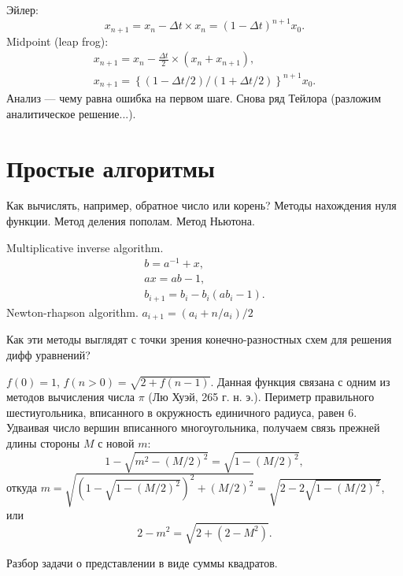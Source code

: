 \documentclass{book}
\begin{document}
Эйлер:
\begin{equation}
    x_{n+1} = x_{n} - \Delta t \times x_n = (1 - \Delta t)^{n + 1} x_0.
\end{equation}
Midpoint (leap frog):
\begin{eqnarray}
    x_{n+1} = x_{n} - \frac{\Delta t}{2} \times (x_n + x_{n+1}), \\
    x_{n+1} = \left\{ (1 - \Delta t / 2) / (1 + \Delta t / 2) \right\}^{n+1} x_0.
\end{eqnarray}
Анализ --- чему равна ошибка на первом шаге. Снова ряд Тейлора (разложим аналитическое решение...).

\section{Простые алгоритмы}

Как вычислять, например, обратное число или корень?
Методы нахождения нуля функции. Метод деления пополам. Метод Ньютона.

Multiplicative inverse algorithm.
\begin{eqnarray}
    b = a^{-1} + x, \\
    ax = ab - 1, \\
    b_{i + 1} = b_i - b_i (ab_i - 1).
\end{eqnarray}
Newton-rhapson algorithm.
$a_{i+1} = (a_i + n / a_i) / 2$

Как эти методы выглядят с точки зрения конечно-разностных схем для решения дифф уравнений?

  $f(0) = 1$, $f(n>0) = \sqrt{2 + f(n - 1)}$. Данная функция связана с
   одним из методов вычисления числа $\pi$ (Лю Хуэй, 265 г. н. э.). Периметр
   правильного шестиугольника, вписанного в окружность единичного радиуса, равен
   $6$. Удваивая число вершин вписанного многоугольника, получаем связь прежней
   длины стороны $M$ с новой $m$:
   \begin{equation}
     1 - \sqrt{m^2 - (M / 2)^2} = \sqrt{1 - (M / 2)^2},
   \end{equation}
   откуда $m = \sqrt{\left(1 - \sqrt{1 - (M / 2)^2}\right)^2 + (M / 2)^2} =
   \sqrt{2 - 2\sqrt{1 - (M / 2)^2}}$, или
   \begin{equation}
     2 - m^2 = \sqrt{2 + (2 - M^2)}.
   \end{equation}


Разбор задачи о представлении в виде суммы квадратов.
\end{document}

